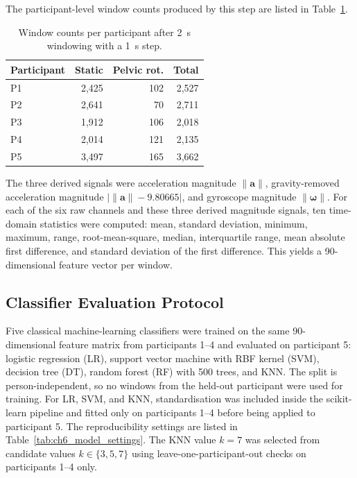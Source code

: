 The participant-level window counts produced by this step are listed in Table~\ref{tab:ch6_window_counts}.

\begin{table}[!htbp]
    \centering
    \footnotesize
    \caption{Window counts per participant after 2~s windowing with a 1~s step.}
    \label{tab:ch6_window_counts}
    \begin{tabular*}{\linewidth}{@{\extracolsep{\fill}}lrrr@{}}
        \toprule
        Participant & Static & Pelvic rot. & Total \\
        \midrule
        P1 & 2,425 & 102 & 2,527 \\
        P2 & 2,641 &  70 & 2,711 \\
        P3 & 1,912 & 106 & 2,018 \\
        P4 & 2,014 & 121 & 2,135 \\
        P5 & 3,497 & 165 & 3,662 \\
        \bottomrule
    \end{tabular*}
\end{table}

The three derived signals were acceleration magnitude \(\|\mathbf{a}\|\), gravity-removed acceleration magnitude \(|\|\mathbf{a}\|-9.80665|\), and gyroscope magnitude \(\|\boldsymbol{\omega}\|\). For each of the six raw channels and these three derived magnitude signals, ten time-domain statistics were computed: mean, standard deviation, minimum, maximum, range, root-mean-square, median, interquartile range, mean absolute first difference, and standard deviation of the first difference. This yields a 90-dimensional feature vector per window.

\subsection{Classifier Evaluation Protocol}\label{sec:classifier_protocol}

Five classical machine-learning classifiers were trained on the same 90-dimensional feature matrix from participants 1--4 and evaluated on participant 5: logistic regression (LR), support vector machine with RBF kernel (SVM), decision tree (DT), random forest (RF) with 500 trees, and KNN. The split is person-independent, so no windows from the held-out participant were used for training. For LR, SVM, and KNN, standardisation was included inside the scikit-learn pipeline and fitted only on participants 1--4 before being applied to participant 5. The reproducibility settings are listed in Table~\ref{tab:ch6_model_settings}. The KNN value \(k=7\) was selected from candidate values \(k\in\{3,5,7\}\) using leave-one-participant-out checks on participants 1--4 only.

